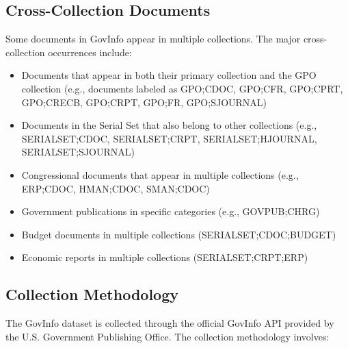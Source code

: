 \subsection{Cross-Collection Documents}

Some documents in GovInfo appear in multiple collections. The major cross-collection occurrences include:

\begin{itemize}
  \item Documents that appear in both their primary collection and the GPO collection (e.g., documents labeled as GPO;CDOC, GPO;CFR, GPO;CPRT, GPO;CRECB, GPO;CRPT, GPO;FR, GPO;SJOURNAL)
  \item Documents in the Serial Set that also belong to other collections (e.g., SERIALSET;CDOC, SERIALSET;CRPT, SERIALSET;HJOURNAL, SERIALSET;SJOURNAL)
  \item Congressional documents that appear in multiple collections (e.g., ERP;CDOC, HMAN;CDOC, SMAN;CDOC)
  \item Government publications in specific categories (e.g., GOVPUB;CHRG)
  \item Budget documents in multiple collections (SERIALSET;CDOC;BUDGET)
  \item Economic reports in multiple collections (SERIALSET;CRPT;ERP)
\end{itemize}

\subsection{Collection Methodology}

The GovInfo dataset is collected through the official GovInfo API provided by the U.S. Government Publishing Office. The collection methodology involves:

